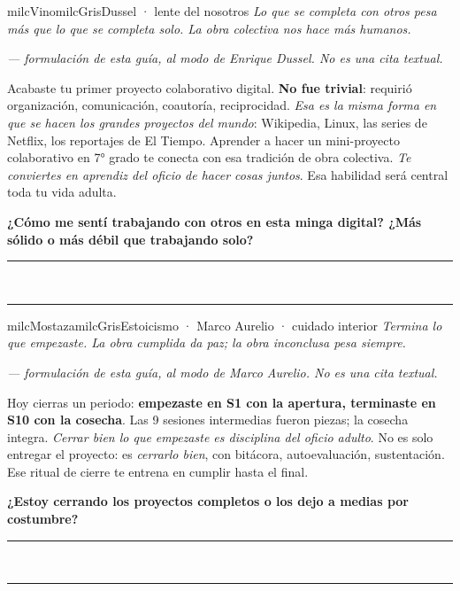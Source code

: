 \documentclass[11pt,letterpaper]{article}
\newcommand{\linead}[1]{\noindent\color{milcLinea}\rule{#1}{0.5pt}\color{milcNegro}}
\begin{document}
\begin{softbox}{milcVino}{milcGris}{Dussel · lente del nosotros}
\textit{Lo que se completa con otros pesa más que lo que se completa solo. La obra colectiva nos hace más humanos.}

{\footnotesize\itshape\color{milcNegro!70}--- formulación de esta guía, al modo de Enrique Dussel. No es una cita textual.}

Acabaste tu primer proyecto colaborativo digital. \textbf{No fue trivial}: requirió organización, comunicación, coautoría, reciprocidad. \emph{Esa es la misma forma en que se hacen los grandes proyectos del mundo}: Wikipedia, Linux, las series de Netflix, los reportajes de El Tiempo. Aprender a hacer un mini-proyecto colaborativo en 7° grado te conecta con esa tradición de obra colectiva. \emph{Te conviertes en aprendiz del oficio de hacer cosas juntos}. Esa habilidad será central toda tu vida adulta.

\textbf{¿Cómo me sentí trabajando con otros en esta minga digital? ¿Más sólido o más débil que trabajando solo?}
\end{softbox}
\linead{\linewidth}\\[1mm]
\linead{\linewidth}

\begin{softbox}{milcMostaza}{milcGris}{Estoicismo · Marco Aurelio · cuidado interior}
\textit{Termina lo que empezaste. La obra cumplida da paz; la obra inconclusa pesa siempre.}

{\footnotesize\itshape\color{milcNegro!70}--- formulación de esta guía, al modo de Marco Aurelio. No es una cita textual.}

Hoy cierras un periodo: \textbf{empezaste en S1 con la apertura, terminaste en S10 con la cosecha}. Las 9 sesiones intermedias fueron piezas; la cosecha integra. \emph{Cerrar bien lo que empezaste es disciplina del oficio adulto}. No es solo entregar el proyecto: es \emph{cerrarlo bien}, con bitácora, autoevaluación, sustentación. Ese ritual de cierre te entrena en cumplir hasta el final.

\textbf{¿Estoy cerrando los proyectos completos o los dejo a medias por costumbre?}
\end{softbox}
\linead{\linewidth}\\[1mm]
\linead{\linewidth}
\end{document}
